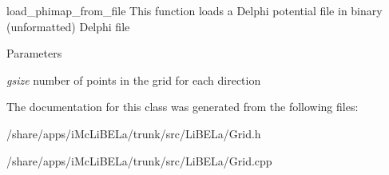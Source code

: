load\_\-phimap\_\-from\_\-file This function loads a Delphi potential file in binary (unformatted) Delphi file 
\begin{DoxyParams}{Parameters}
\item[{\em gsize}]number of points in the grid for each direction \end{DoxyParams}


The documentation for this class was generated from the following files:\begin{DoxyCompactItemize}
\item 
/share/apps/iMcLiBELa/trunk/src/LiBELa/Grid.h\item 
/share/apps/iMcLiBELa/trunk/src/LiBELa/Grid.cpp\end{DoxyCompactItemize}
